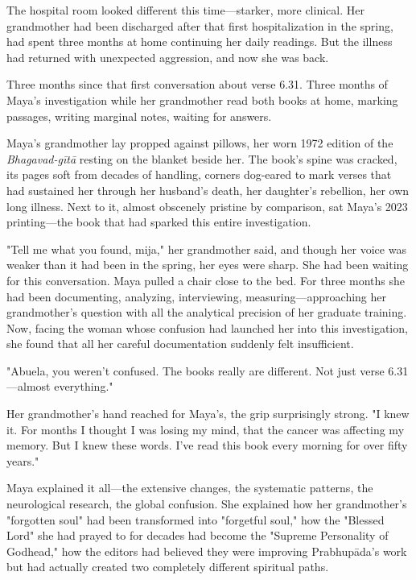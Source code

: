 \documentclass[12pt,twoside]{book}
\begin{document}
\normalfont\justifying

The hospital room looked different this time—starker, more clinical. Her grandmother had been discharged after that first hospitalization in the spring, had spent three months at home continuing her daily readings. But the illness had returned with unexpected aggression, and now she was back.

Three months since that first conversation about verse 6.31. Three months of Maya's investigation while her grandmother read both books at home, marking passages, writing marginal notes, waiting for answers.

Maya's grandmother lay propped against pillows, her worn 1972 edition of the \emph{Bhagavad-gītā} resting on the blanket beside her. The book's spine was cracked, its pages soft from decades of handling, corners dog-eared to mark verses that had sustained her through her husband's death, her daughter's rebellion, her own long illness. Next to it, almost obscenely pristine by comparison, sat Maya's 2023 printing—the book that had sparked this entire investigation.

"Tell me what you found, mija," her grandmother said, and though her voice was weaker than it had been in the spring, her eyes were sharp. She had been waiting for this conversation.
Maya pulled a chair close to the bed. For three months she had been documenting, analyzing, interviewing, measuring—approaching her grandmother's question with all the analytical precision of her graduate training. Now, facing the woman whose confusion had launched her into this investigation, she found that all her careful documentation suddenly felt insufficient.

"Abuela, you weren't confused. The books really are different. Not just verse 6.31—almost everything."

Her grandmother's hand reached for Maya's, the grip surprisingly strong. "I knew it. For months I thought I was losing my mind, that the cancer was affecting my memory. But I knew these words. I've read this book every morning for over fifty years."

Maya explained it all—the extensive changes, the systematic patterns, the neurological research, the global confusion. She explained how her grandmother's "forgotten soul" had been transformed into "forgetful soul," how the "Blessed Lord" she had prayed to for decades had become the "Supreme Personality of Godhead," how the editors had believed they were improving Prabhupāda's work but had actually created two completely different spiritual paths.
\end{document}

